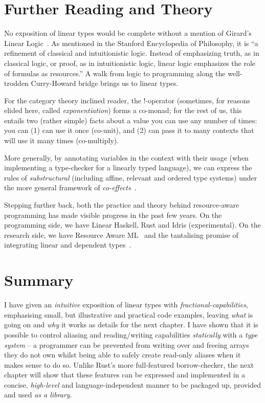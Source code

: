 \section{Further Reading and Theory}\label{sec:further}


No exposition of linear types would be complete without a mention of Girard's
Linear Logic~\cite{girard}. As mentioned in the Stanford Encyclopedia of
Philosophy, it is ``a refinement of classical and intuitionistic logic. Instead
of emphasizing truth, as in classical logic, or proof, as in intuitionistic
logic, linear logic emphasizes the role of formulas as resources.'' A walk from
logic to programming along the well-trodden Curry-Howard bridge brings us to
linear types.

For the category theory inclined reader, the !-operator (sometimes, for reasons
elided here, called \emph{exponentiation}) forms a co-monad; for the rest of
us, this entails two (rather simple) facts about a value you can use any number
of times: you can (1) can use it once (co-unit), and (2) can pass it to many
contexts that will use it many times (co-multiply).

More generally, by annotating variables in the context with their usage (when
implementing a type-checker for a linearly typed language), we can express the
rules of \emph{substructural} (including affine, relevant and ordered type
systems) under the more general framework of \emph{co-effects}~\cite{petricek}.

Stepping further back, both the practice and theory behind resource-aware
programming has made visible progress in the past few years.  On the
programming side, we have Linear Haskell, Rust and Idris (experimental). On the
research side, we have Resource Aware ML~\cite{hoffmann} and the tantalising
promise of integrating linear and dependent types~\cite{atkey}.

\section{Summary}

I have given an \emph{intuitive} exposition of linear types with
\emph{fractional-capabilities}, emphasising small, but illustrative and
practical code examples, leaving \emph{what} is going on and \emph{why} it
works as details for the next chapter. I have shown that it is possible to
control aliasing and reading/writing capabilities \emph{statically} with a
\emph{type system} -- a programmer can be prevented from writing over and
freeing arrays they do not own whilst being able to safely create read-only
aliases when it makes sense to do so. Unlike Rust's more full-featured
borrow-checker, the next chapter will show that these features can be expressed
and implemented in a concise, \emph{high-level} and language-independent manner
to be packaged up, provided and used \emph{as a library}.
